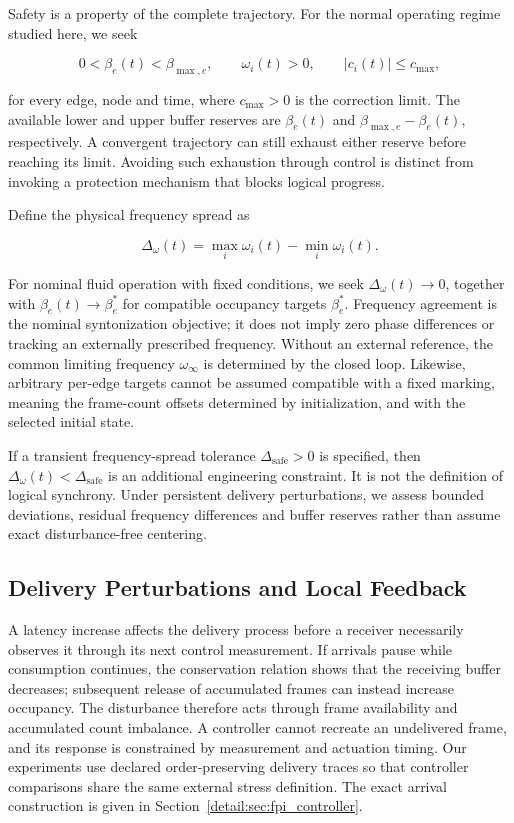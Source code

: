 Safety is a property of the complete trajectory. For the normal operating regime studied here, we seek

\begin{equation}
0<\beta_e(t)<\beta_{\max,e},\qquad
\omega_i(t)>0,\qquad |c_i(t)|\le c_{\max},
\end{equation}

for every edge, node and time, where $c_{\max}>0$ is the correction limit. The available lower and upper buffer reserves are $\beta_e(t)$ and $\beta_{\max,e}-\beta_e(t)$, respectively. A convergent trajectory can still exhaust either reserve before reaching its limit. Avoiding such exhaustion through control is distinct from invoking a protection mechanism that blocks logical progress.

Define the physical frequency spread as

\begin{equation}
\Delta_\omega(t)=\max_i\omega_i(t)-\min_i\omega_i(t).
\end{equation}

For nominal fluid operation with fixed conditions, we seek $\Delta_\omega(t)\to0$, together with $\beta_e(t)\to\beta_e^*$ for compatible occupancy targets $\beta_e^*$. Frequency agreement is the nominal syntonization objective; it does not imply zero phase differences or tracking an externally prescribed frequency. Without an external reference, the common limiting frequency $\omega_\infty$ is determined by the closed loop. Likewise, arbitrary per-edge targets cannot be assumed compatible with a fixed marking, meaning the frame-count offsets determined by initialization, and with the selected initial state.

If a transient frequency-spread tolerance $\Delta_{\mathrm{safe}}>0$ is specified, then $\Delta_\omega(t)<\Delta_{\mathrm{safe}}$ is an additional engineering constraint. It is not the definition of logical synchrony. Under persistent delivery perturbations, we assess bounded deviations, residual frequency differences and buffer reserves rather than assume exact disturbance-free centering.

\subsection{Delivery Perturbations and Local Feedback}

A latency increase affects the delivery process before a receiver necessarily observes it through its next control measurement. If arrivals pause while consumption continues, the conservation relation shows that the receiving buffer decreases; subsequent release of accumulated frames can instead increase occupancy. The disturbance therefore acts through frame availability and accumulated count imbalance. A controller cannot recreate an undelivered frame, and its response is constrained by measurement and actuation timing. Our experiments use declared order-preserving delivery traces so that controller comparisons share the same external stress definition. The exact arrival construction is given in Section~\ref{detail:sec:fpi_controller}.

